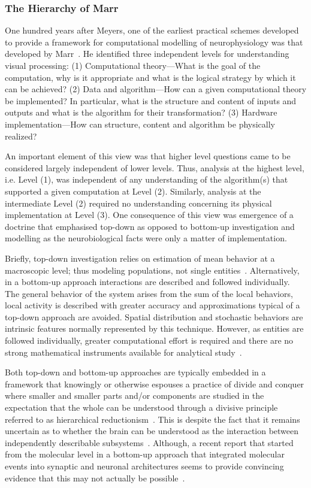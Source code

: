 \documentclass[10pt,letterpaper]{article}
\begin{document}
\subsubsection*{The Hierarchy of Marr}

One hundred years after Meyers, one of the earliest practical schemes developed to provide a framework for computational modelling of neurophysiology was that developed by Marr~\cite{Marr:1982fk}. He identified three independent levels for understanding visual processing: (1) Computational theory---What is the goal of the computation, why is it appropriate and what is the logical strategy by which it can be achieved? (2) Data and algorithm---How can a given computational theory be implemented? In particular, what is the structure and content of inputs and outputs and what is the algorithm for their transformation? (3) Hardware implementation---How can structure, content and algorithm be physically realized?

An important element of this view was that higher level questions came to be considered largely independent of lower levels. Thus, analysis at the highest level, i.e. Level (1), was independent of any understanding of the algorithm(s) that supported a given computation at Level (2). Similarly, analysis at the intermediate Level (2) required no understanding concerning its physical implementation at Level (3). One consequence of this view was emergence of a doctrine that emphasised top-down as opposed to bottom-up investigation and modelling as the neurobiological facts were only a matter of implementation.

Briefly, top-down investigation relies on estimation of mean behavior at a macroscopic level; thus modeling populations, not single entities~\cite{chiacchio14}.  Alternatively, in a bottom-up approach interactions are described and followed individually. The general behavior of the system arises from the sum of the local behaviors, local activity is described with greater accuracy and approximations typical of a top-down approach are avoided.  Spatial distribution and stochastic behaviors are intrinsic features normally represented by this technique. However, as entities are followed individually, greater computational effort is required and there are no strong mathematical instruments available for analytical study~\cite{chiacchio14}.

Both top-down and bottom-up approaches are typically embedded in a framework that knowingly or otherwise espouses a practice of divide and conquer where smaller and smaller parts and/or components are studied in the expectation that the whole can be understood through a divisive principle referred to as hierarchical reductionism~\cite{dawkins06}. This is despite the fact that it remains uncertain as to whether the brain can be understood as the interaction between independently describable subsystems~\cite{djurfeldt08}. Although, a recent report that started from the molecular level in a bottom-up approach that integrated molecular events into synaptic and neuronal architectures seems to provide convincing evidence that this may not actually be possible~\cite{bouteiller11}.
\end{document}
